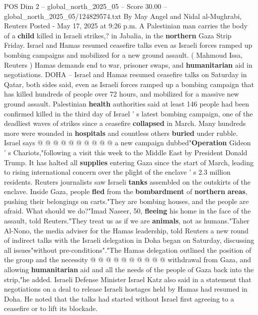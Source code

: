 \begin{textsample}{POS Dim 2 – global\_north\_2025\_05 – Score 30.00 – global\_north\_2025\_05/124829574.txt}  \label{ex:f2_pos_212}
By May Angel and Nidal al-Mughrabi, Reuters Posted - May 17, 2025 at 9:26 p.m.
A Palestinian man carries the body of a \textbf{child} killed in Israeli strikes,? in Jabalia, in the \textbf{northern} Gaza Strip Friday.
Israel and Hamas resumed ceasefire talks even as Israeli forces ramped up bombing campaigns and mobilized for a new ground assault. ( Mahmoud Issa, Reuters ) Hamas demands end to war, prisoner swaps, and \textbf{humanitarian} aid in negotiations.
DOHA -- Israel and Hamas resumed ceasefire talks on Saturday in Qatar, both sides said, even as Israeli forces ramped up a bombing campaign that has killed hundreds of people over 72 hours, and mobilized for a massive new ground assault.
Palestinian \textbf{health} authorities said at least 146 people had been confirmed killed in the third day of Israel ' s latest bombing campaign, one of the deadliest waves of strikes since a ceasefire \textbf{collapsed} in March.
Many hundreds more were wounded in \textbf{hospitals} and countless others \textbf{buried} under rubble.
Israel says @ @ @ @ @ @ @ @ @ @ a new campaign dubbed"\textbf{Operation} Gideon ' s Chariots,"following a visit this week to the Middle East by President Donald Trump.
It has halted all \textbf{supplies} entering Gaza since the start of March, leading to rising international concern over the plight of the enclave ' s 2.3 million residents.
Reuters journalists saw Israeli \textbf{tanks} assembled on the outskirts of the enclave.
Inside Gaza, people \textbf{fled} from the \textbf{bombardment} of \textbf{northern} \textbf{areas}, pushing their belongings on carts."They are bombing houses, and the people are afraid.
What should we do?"Imad Naseer, 50, \textbf{fleeing} his home in the face of the assault, told Reuters."They treat us as if we are \textbf{animals}, not as humans."Taher Al-Nono, the media adviser for the Hamas leadership, told Reuters a new round of indirect talks with the Israeli delegation in Doha began on Saturday, discussing all issues"without pre-conditions"."The Hamas delegation outlined the position of the group and the necessity @ @ @ @ @ @ @ @ @ @ withdrawal from Gaza, and allowing \textbf{humanitarian} aid and all the needs of the people of Gaza back into the strip,"he added.
Israeli Defense Minister Israel Katz also said in a statement that negotiations on a deal to release Israeli hostages held by Hamas had resumed in Doha.
He noted that the talks had started without Israel first agreeing to a ceasefire or to lift its blockade.

\end{textsample}
